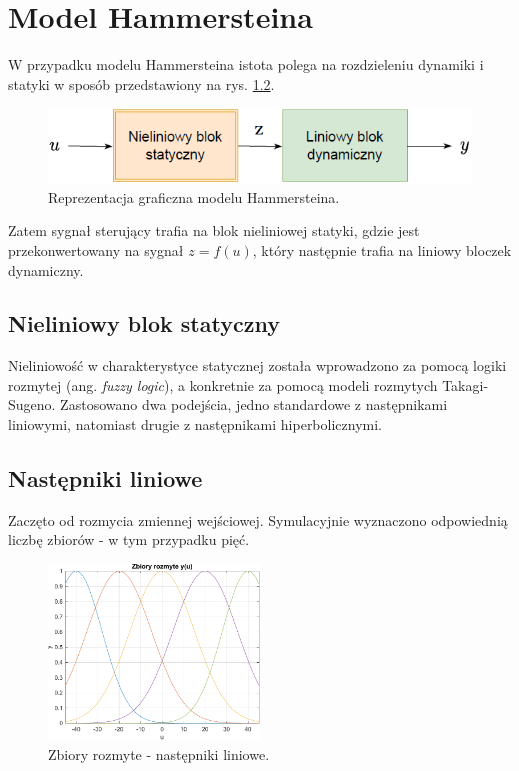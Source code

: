 \chapter{Model Hammersteina}
W przypadku modelu Hammersteina istota polega na rozdzieleniu dynamiki i statyki w sposób przedstawiony na rys. \ref{hamm_model}.

\begin{figure}[h!]
\centering
\includegraphics[width=\textwidth]{pictures/hamm_model}
\caption{Reprezentacja graficzna modelu Hammersteina.}
\label{hamm_model}
\end{figure}

\noindent Zatem sygnał sterujący trafia na blok nieliniowej statyki, gdzie jest przekonwertowany na sygnał $z = f(u)$, który następnie trafia na liniowy bloczek dynamiczny. 

\section{Nieliniowy blok statyczny}
Nieliniowość w charakterystyce statycznej została wprowadzono za pomocą logiki rozmytej (ang. \textit{fuzzy logic}), a konkretnie za pomocą modeli rozmytych Takagi-Sugeno. Zastosowano dwa podejścia, jedno standardowe z następnikami liniowymi, natomiast drugie z następnikami hiperbolicznymi.

\section{Następniki liniowe}
Zaczęto od rozmycia zmiennej wejściowej. Symulacyjnie wyznaczono odpowiednią liczbę zbiorów - w tym przypadku pięć.

\begin{figure}[h!]
\centering
\includegraphics[width=0.5\textwidth]{pictures/fuzzy_set_ham}
\caption{Zbiory rozmyte - następniki liniowe.}
\label{hamm_model}
\end{figure}

